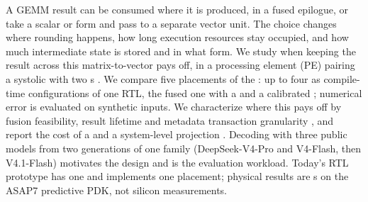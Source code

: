 %
A GEMM result can be consumed where it is produced, in a fused epilogue, or take a scalar or \blockscaled form and pass to a separate vector unit.
The choice changes where rounding happens, how long execution resources stay occupied, and how much intermediate state is stored and in what form.
We study when keeping the result \blockscaled across this matrix-to-vector \handoff pays off, in a processing element (PE) pairing a systolic \TensorUnit with two \VectorCore{}s .
We compare five placements of the \handoff: up to four as compile-time configurations of one RTL, the fused one with a \evSlice and a calibrated \evModel; numerical error is evaluated on synthetic inputs.
We characterize where this pays off by fusion feasibility, result lifetime and metadata transaction granularity , and report the cost of a \failvisible \handoff {} and a system-level projection .
Decoding with three public models from two generations of one family (DeepSeek-V4-Pro and V4-Flash, then V4.1-Flash) motivates the design and is the evaluation workload.
Today's RTL prototype has one \VectorCore and implements one placement; physical results are \evPostRoute{}s on the ASAP7 predictive PDK, not silicon measurements.
